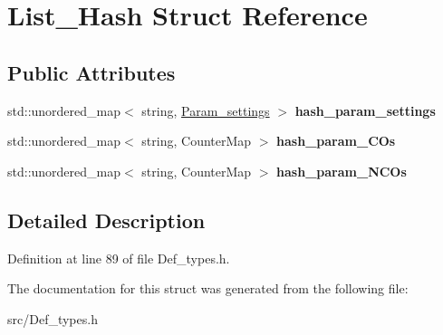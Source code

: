 \hypertarget{struct_list___hash}{}\section{List\+\_\+\+Hash Struct Reference}
\label{struct_list___hash}
\subsection*{Public Attributes}
\begin{DoxyCompactItemize}
\item 
\mbox{\label{struct_list___hash_a63aefb1271b9bd794b7e6544fc2c943f}} 
std\+::unordered\+\_\+map$<$ string, \mbox{\hyperlink{struct_param__settings}{Param\+\_\+settings}} $>$ {\bfseries hash\+\_\+param\+\_\+settings}
\item 
\mbox{\label{struct_list___hash_a5dce3125bc0cbae69798a62e1b365317}} 
std\+::unordered\+\_\+map$<$ string, Counter\+Map $>$ {\bfseries hash\+\_\+param\+\_\+\+C\+Os}
\item 
\mbox{\label{struct_list___hash_a32b5a5b543f5070c3104c83f91bfff16}} 
std\+::unordered\+\_\+map$<$ string, Counter\+Map $>$ {\bfseries hash\+\_\+param\+\_\+\+N\+C\+Os}
\end{DoxyCompactItemize}


\subsection{Detailed Description}


Definition at line 89 of file Def\+\_\+types.\+h.



The documentation for this struct was generated from the following file\+:\begin{DoxyCompactItemize}
\item 
src/Def\+\_\+types.\+h\end{DoxyCompactItemize}
